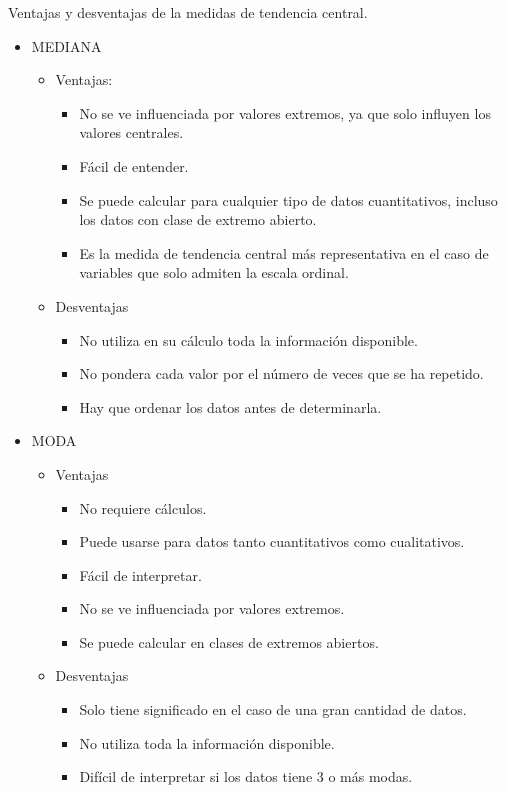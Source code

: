 \begin{myalertblock}{Ventajas y desventajas de la medidas de tendencia central.}
\begin{itemize}
\item MEDIANA
	\begin{itemize}
	\item Ventajas:
		\begin{itemize}
		\item No se ve influenciada por valores extremos, ya que solo influyen los valores centrales.
		\item Fácil de entender.
		\item Se puede calcular para cualquier tipo de datos cuantitativos, incluso los datos con clase de extremo abierto.
		\item Es la medida de tendencia central más representativa en el caso de variables que solo admiten la escala ordinal.
		\end{itemize}
	\item Desventajas
		\begin{itemize}
		\item No utiliza en su cálculo toda la información disponible.
		\item No pondera cada valor por el número de veces que se ha repetido.
		\item Hay que ordenar los datos antes de determinarla.
		\end{itemize}
	\end{itemize}

\item MODA
	\begin{itemize}
		\item Ventajas
		\begin{itemize}
		\item No requiere cálculos.
		\item Puede usarse para datos tanto cuantitativos como cualitativos.
		\item Fácil de interpretar.
		\item No se ve influenciada por valores extremos.
		\item Se puede calcular en clases de extremos abiertos.
		\end{itemize}
	\item Desventajas
		\begin{itemize}
		\item Solo tiene significado en el caso de una gran cantidad de datos.
		\item No utiliza toda la información disponible.
		\item Difícil de interpretar si los datos tiene 3 o más modas.
		\end{itemize}
	\end{itemize}

\end{itemize}
	
\end{myalertblock}


